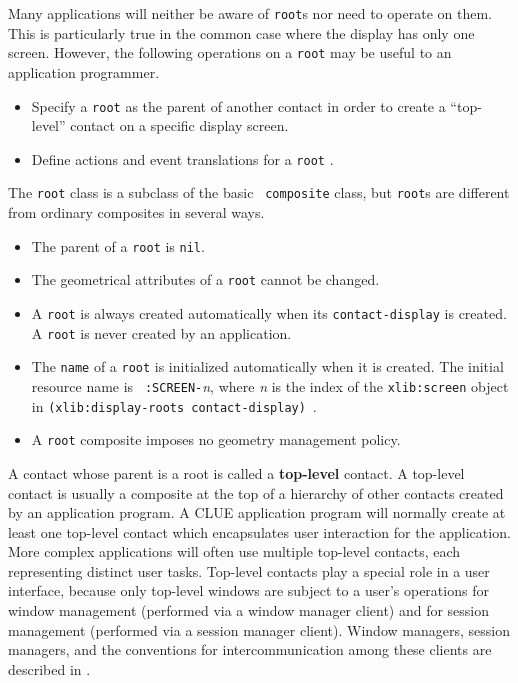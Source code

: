 \documentclass[twoside]{book}
\begin{document}
\begin{sloppy}
Many applications will neither be aware of {\tt root}s nor need  to
operate on them. This is particularly true in the common case where the display
has only one screen.
However, the following operations on a {\tt root}
may be useful to an application programmer. 
\begin{itemize}
\item Specify a {\tt root} as the parent of another contact in order
to create a ``top-level'' contact on a specific display screen.
\item Define actions and event translations for a {\tt root}
\footnotemark{}. 
\end{itemize}

The {\tt root} class is a subclass of the basic {\tt
composite} class,
but {\tt root}s are different from ordinary composites in several ways.
\begin{itemize}
\item The parent of a {\tt root} is {\tt nil}.
\item The geometrical attributes of a {\tt root} cannot be changed.
\item A {\tt root} is always created automatically when its
{\tt contact-display} is created. A {\tt root} is never created by an
application. \item The {\tt name} of a {\tt root} is
initialized automatically when it is created. The initial resource name is {\tt
:SCREEN-}{\em n}, where {\em n} is the index of the
{\tt xlib:screen} object in {\tt (xlib:display-roots
contact-display)}~\footnotemark{}.
\item A {\tt root} composite imposes no geometry management policy.
\end{itemize}




A contact whose parent is a root is called a {\bf
top-level} contact. A top-level contact is usually
a composite at the top of a hierarchy
of other contacts created by an application program. A CLUE application program
will
normally create at least one top-level contact which encapsulates user
interaction for the application. More complex applications will often use multiple
top-level contacts, each representing distinct user tasks. Top-level contacts
play a special role in a user interface, because only top-level windows are
subject to a user's operations for window management (performed via a window
manager client) and for session management (performed via a session manager
client). Window managers, session managers, and the conventions for
intercommunication among these clients are described in \cite{icccm}.


\end{sloppy}
\end{document}
